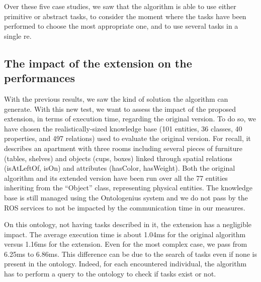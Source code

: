 Over these five case studies, we saw that the algorithm is able to use either primitive or abstract tasks, to consider the moment where the tasks have been performed to choose the most appropriate one, and to use several tasks in a single \acrshort{re}.

\subsection{The impact of the extension on the performances}

With the previous results, we saw the kind of solution the algorithm can generate. With this new test, we want to assess the impact of the proposed extension, in terms of execution time, regarding the original version. To do so, we have chosen the realistically-sized knowledge base (101 entities, 36 classes, 40 properties, and 497 relations) used to evaluate the original version. For recall, it describes an apartment with three rooms including several pieces of furniture (tables, shelves) and objects (cups, boxes) linked through spatial relations (isAtLeftOf, isOn) and attributes (hasColor, hasWeight). Both the original algorithm and its extended version have been run over all the 77 entities inheriting from the ``Object'' class, representing physical entities. The knowledge base is still managed using the Ontologenius system and we do not pass by the ROS services to not be impacted by the communication time in our measures.

On this ontology, not having tasks described in it, the extension has a negligible impact. The average execution time is about 1.04ms for the original algorithm versus 1.16ms for the extension. Even for the most complex case, we pass from 6.25ms to 6.86ms. This difference can be due to the search of tasks even if none is present in the ontology. Indeed, for each encountered individual, the algorithm has to perform a query to the ontology to check if tasks exist or not.

